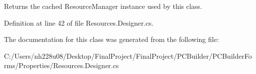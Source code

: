 Returns the cached Resource\+Manager instance used by this class. 



Definition at line 42 of file Resources.\+Designer.\+cs.



The documentation for this class was generated from the following file\+:\begin{DoxyCompactItemize}
\item 
C\+:/\+Users/nh228u08/\+Desktop/\+Final\+Project/\+Final\+Project/\+P\+C\+Builder/\+P\+C\+Builder\+Forms/\+Properties/Resources.\+Designer.\+cs\end{DoxyCompactItemize}
